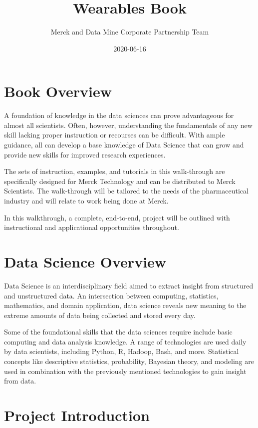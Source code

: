 \documentclass[]{book}
\title{Wearables Book}
\author{Merck and Data Mine Corporate Partnership Team}
\date{2020-06-16}
\begin{document}
\maketitle

{
\setcounter{tocdepth}{1}
\tableofcontents
}
\chapter{Book Overview}\label{book-overview}

A foundation of knowledge in the data sciences can prove advantageous
for almost all scientists. Often, however, understanding the
fundamentals of any new skill lacking proper instruction or recourses
can be difficult. With ample guidance, all can develop a base knowledge
of Data Science that can grow and provide new skills for improved
research experiences.

The sets of instruction, examples, and tutorials in this walk-through
are specifically designed for Merck Technology and can be distributed to
Merck Scientists. The walk-through will be tailored to the needs of the
pharmaceutical industry and will relate to work being done at Merck.

In this walkthrough, a complete, end-to-end, project will be outlined
with instructional and applicational opportunities throughout.

\chapter{Data Science Overview}\label{intro}

Data Science is an interdisciplinary field aimed to extract insight from
structured and unstructured data. An intersection between computing,
statistics, mathematics, and domain application, data science reveals
new meaning to the extreme amounts of data being collected and stored
every day.

Some of the foundational skills that the data sciences require include
basic computing and data analysis knowledge. A range of technologies are
used daily by data scientists, including Python, R, Hadoop, Bash, and
more. Statistical concepts like descriptive statistics, probability,
Bayesian theory, and modeling are used in combination with the
previously mentioned technologies to gain insight from data.

\chapter{Project Introduction}\label{project-introduction}
\end{document}
